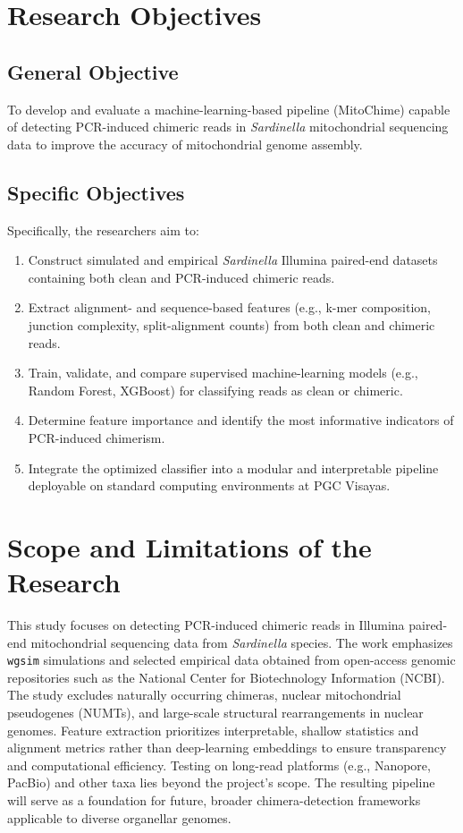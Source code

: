 \section{Research Objectives}\label{subsecsec:researchobjectives}

\subsection{General Objective}\label{subsec:generalobjective}

To develop and evaluate a machine-learning-based pipeline (MitoChime) capable of detecting PCR-induced chimeric reads in \textit{Sardinella} mitochondrial sequencing data to improve the accuracy of mitochondrial genome assembly.

\subsection{Specific Objectives}\label{subsec:specificobjectives}

Specifically, the researchers aim to:
\begin{enumerate}
  \item Construct simulated and empirical \textit{Sardinella} Illumina paired-end datasets containing both clean and PCR-induced chimeric reads.
  \item Extract alignment- and sequence-based features (e.g., k-mer composition, junction complexity, split-alignment counts) from both clean and chimeric reads.
  \item Train, validate, and compare supervised machine-learning models (e.g., Random Forest, XGBoost) for classifying reads as clean or chimeric.
  \item Determine feature importance and identify the most informative indicators of PCR-induced chimerism.
  \item Integrate the optimized classifier into a modular and interpretable pipeline deployable on standard computing environments at PGC Visayas.
\end{enumerate}

\section{Scope and Limitations of the Research}\label{sec:scopelimitations}

This study focuses on detecting PCR-induced chimeric reads in Illumina paired-end mitochondrial sequencing data from \textit{Sardinella} species. The work emphasizes \texttt{wgsim} simulations and selected empirical data obtained from open-access genomic repositories such as the National Center for Biotechnology Information (NCBI). The study excludes naturally occurring chimeras, nuclear mitochondrial pseudogenes (NUMTs), and large-scale structural rearrangements in nuclear genomes. Feature extraction prioritizes interpretable, shallow statistics and alignment metrics rather than deep-learning embeddings to ensure transparency and computational efficiency. Testing on long-read platforms (e.g., Nanopore, PacBio) and other taxa lies beyond the project’s scope. The resulting pipeline will serve as a foundation for future, broader chimera-detection frameworks applicable to diverse organellar genomes.

